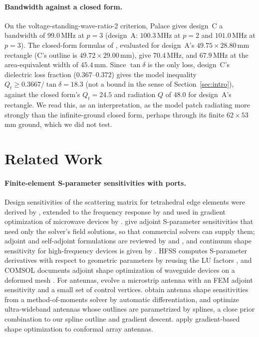 \documentclass{anvil-paper}
\begin{document}
\paragraph{Bandwidth against a closed form.}
On the voltage-standing-wave-ratio-2 criterion, Palace gives design~C a
bandwidth of $99.0$\,MHz at $p = 3$ (design~A: $100.3$\,MHz at $p = 2$ and
$101.0$\,MHz at $p = 3$). The closed-form formulas of
\citet{jackson1991simple}, evaluated for design~A's $49.75\times28.80$\,mm
rectangle (C's outline is $49.72\times29.00$\,mm), give $70.4$\,MHz, and
$67.9$\,MHz at the area-equivalent width of $45.4$\,mm. Since $\tan\delta$ is
the only loss, design~C's dielectric loss fraction ($0.367$--$0.372$) gives the
model inequality $Q_t \ge 0.3667/\tan\delta = 18.3$ (not a bound in the sense of
Section~\ref{sec:intro}), against the closed form's $Q_t = 24.5$ and radiation
$Q$ of $48.0$ for design~A's rectangle. We read this, as an interpretation, as
the model patch radiating more strongly than the infinite-ground closed form,
perhaps through its finite $62\times53$\,mm ground, which we did not test.

\section{Related Work}
\label{sec:related}

\paragraph{Finite-element S-parameter sensitivities with ports.}
Design sensitivities of the scattering matrix for tetrahedral edge elements
were derived by \citet{webb2000design}, extended to the frequency response
by \citet{webb2002design} and used in gradient optimization of microwave
devices by \citet{nair2003optimization}. \citet{georgieva2002feasible} give
adjoint S-parameter sensitivities that need only the solver's field
solutions, so that commercial solvers can supply them; adjoint and
self-adjoint formulations are reviewed by \citet{nikolova2004adjoint} and
\citet{nikolova2006network}, and continuum shape sensitivity for
high-frequency devices is given by \citet{choi2011generalized}. HFSS computes
S-parameter derivatives with respect to geometric parameters by reusing the
LU factors \citep{ansys_hfss_derivatives,vardapetyan2008sensitivity}, and
COMSOL documents adjoint shape optimization of waveguide devices on a
deformed mesh \citep{comsol_sensitivity_method,jensen2022comsolshape}. For
antennas, \citet{ghassemi2013antenna} evolve a microstrip antenna with an FEM
adjoint sensitivity and a small set of control vertices.
\citet{toivanen2009electromagnetic} obtain antenna shape sensitivities from a
method-of-moments solver by automatic differentiation, and
\citet{toivanen2010gradient} optimize ultra-wideband antennas whose outlines
are parametrized by splines, a close prior combination to our spline
outline and gradient descent. \citet{jacobsson2010gradient} apply
gradient-based shape optimization to conformal array antennas.
\end{document}
